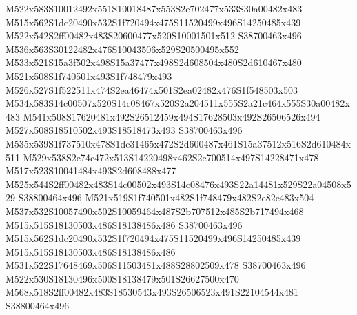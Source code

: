 \documentclass{article}
\begin{document}
\begin{multicols}{2}
M522x583S10012492x551S10018487x553S2e702477x533S30a00482x483 M515x562S1dc20490x532S1f720494x475S11520499x496S14250485x439 M522x542S2ff00482x483S20600477x520S10001501x512 S38700463x496 M536x563S30122482x476S10043506x529S20500495x552 M533x521S15a3f502x498S15a37477x498S2d608504x480S2d610467x480 M521x508S1f740501x493S1f748479x493 M526x527S1f522511x474S2ea46474x501S2ea02482x476S1f548503x503 M534x583S14c00507x520S14c08467x520S2a204511x555S2a21c464x555S30a00482x483 M541x508S17620481x492S26512459x494S17628503x492S26506526x494 M527x508S18510502x493S18518473x493 S38700463x496 M535x539S1f737510x478S1dc31465x472S2d600487x461S15a37512x516S2d610484x511 M529x538S2e74c472x513S14220498x462S2e700514x497S14228471x478 M517x523S10041484x493S2d608488x477 M525x544S2ff00482x483S14c00502x493S14c08476x493S22a14481x529S22a04508x529 S38800464x496 M521x519S1f740501x482S1f748479x482S2e82e483x504 M537x532S10057490x502S10059464x487S2b707512x485S2b717494x468 M515x515S18130503x486S18138486x486 S38700463x496 M515x562S1dc20490x532S1f720494x475S11520499x496S14250485x439 M515x515S18130503x486S18138486x486 M531x522S17648469x506S11503481x488S28802509x478 S38700463x496 M522x530S18130496x500S18138479x501S26627500x470 M568x518S2ff00482x483S18530543x493S26506523x491S22104544x481 S38800464x496









\end{multicols}
\end{document}
